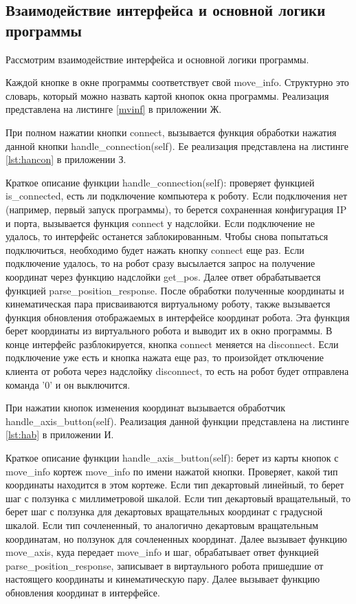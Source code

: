 \documentclass[a4paper,14pt]{extarticle}
\begin{document}
\subsection{Взаимодействие интерфейса и основной логики программы}
Рассмотрим взаимодействие интерфейса и основной логики программы.


Каждой кнопке в окне программы соответствует свой move\_info.
Структурно это словарь, который можно назвать картой кнопок окна программы.
Реализация представлена на листинге \ref{mvinf} в приложении Ж.


При полном нажатии кнопки connect, вызывается функция обработки
нажатия данной кнопки handle\_connection(self). Ее реализация
представлена на листинге \ref{lst:hancon} в приложении З.


Краткое описание функции handle\_connection(self):
проверяет функцией is\_connected, есть ли подключение
компьютера к роботу. Если подключения нет (например, первый запуск программы),
то берется сохраненная конфигурация IP и порта, вызывается функция connect
у надслойки. Если подключение не удалось, то интерфейс останется заблокированным.
Чтобы снова попытаться подключиться, необходимо будет нажать кнопку connect еще раз.
Если подключение удалось, то на робот сразу высылается запрос на получение
координат через функцию надслойки get\_pos. Далее ответ обрабатывается
функцией parse\_position\_response. После обработки полученные координаты
и кинематическая пара присваиваются виртуальному роботу, также вызывается
функция обновления отображаемых в интерфейсе координат робота. Эта функция
берет координаты из виртуального робота и выводит их в окно программы.
В конце интерфейс разблокируется, кнопка connect меняется на disconnect.
Если подключение уже есть и кнопка нажата еще раз, то произойдет отключение
клиента от робота через надслойку disconnect, то есть на робот будет
отправлена команда '0' и он выключится.



При нажатии кнопок изменения координат вызывается обработчик\\
handle\_axis\_button(self). Реализация данной функции представлена
на листинге \ref{lst:hab} в приложении И.


Краткое описание функции handle\_axis\_button(self):
берет из карты кнопок с move\_info кортеж move\_info по имени нажатой кнопки.
Проверяет, какой тип координаты находится в этом кортеже. Если тип декартовый линейный,
то берет шаг с ползунка с миллиметровой шкалой. Если тип декартовый вращательный,
то берет шаг с ползунка для декартовых вращательных координат с градусной шкалой.
Если тип сочлененный, то аналогично декартовым вращательным координатам, но
ползунок для сочлененных координат. Далее вызывает функцию move\_axis, куда передает
move\_info и шаг,
обрабатывает ответ функцией parse\_position\_response, записывает
в виртаульного робота пришедшие от настоящего координаты и кинематическую пару.
Далее вызывает функцию обновления координат в интерфейсе.
\end{document}
